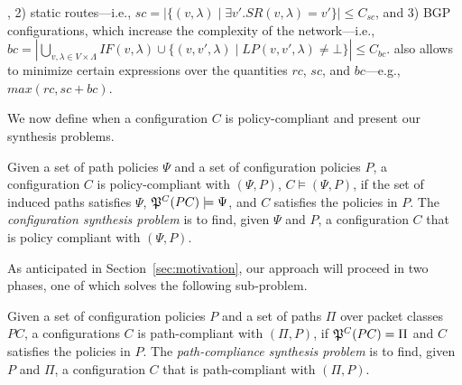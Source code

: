 ,
2) static routes---i.e., $sc=|\{(v,\lambda)\mid \exists v'. SR(v,\lambda)=v'\}|\leq C_{sc}$, and
3) BGP configurations, which increase the complexity of the network---i.e., 
$bc=|\bigcup_{v,\lambda\in V\times\Lambda} IF(v,\lambda)\cup \{(v,v',\lambda)\mid LP(v,v',\lambda)\neq \bot\}|\leq C_{bc}$.
\name also allows to minimize certain expressions over the quantities $rc$, $sc$, and $bc$---e.g., $max(rc, sc+bc)$. 




\noindent We now define when a configuration $C$ is policy-compliant
and present our synthesis problems.
\begin{definition} \label{def:policycompliance}
	Given a set of path policies $\Psi$ and a set of configuration policies $P$,
	a configuration $C$ is policy-compliant with $(\Psi,P)$,
	$C \models (\Psi,P)$, if the set of
	induced paths satisfies $\Psi$, $\mathfrak{P}^C(PC) \models \Psi$,
	and $C$ satisfies the policies in $P$.
	The \emph{configuration synthesis problem} is to find, given $\Psi$ and $P$,
a configuration $C$ that is policy compliant with $(\Psi,P)$.
\end{definition}

As anticipated in Section~\ref{sec:motivation}, our approach will proceed in two phases,
one of which solves the following sub-problem.  
\begin{definition} \label{def:pathcompliance}
Given a set of configuration policies $P$
and a set of paths $\Pi$ over packet classes $PC$,
	a configurations $C$ is path-compliant with 
	$(\Pi,P)$,
	if $\mathfrak{P}^C(PC)=\Pi$ and $C$ satisfies the policies in $P$.
	The \emph{path-compliance synthesis problem} is to find, given $P$ and $\Pi$,
a configuration $C$ that is path-compliant with $(\Pi,P)$.
\end{definition}



